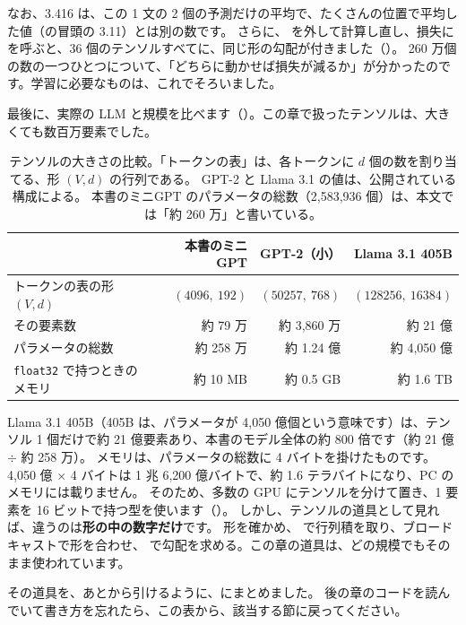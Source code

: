 なお、3.416 は、この 1 文の 2 個の予測だけの平均で、たくさんの位置で平均した値（の冒頭の 3.11）とは別の数です。
さらに、 を外して計算し直し、損失に  を呼ぶと、36 個のテンソルすべてに、同じ形の勾配が付きました（）。
260 万個の数の一つひとつについて、「どちらに動かせば損失が減るか」が分かったのです。学習に必要なものは、これでそろいました。

最後に、実際の LLM と規模を比べます（）。この章で扱ったテンソルは、大きくても数百万要素でした。

\begin{table}[tbp]
\centering
\caption{テンソルの大きさの比較。「トークンの表」は、各トークンに $d$ 個の数を割り当てる、形 $(V,d)$ の行列である。
GPT-2 と Llama 3.1 の値は、公開されている構成による\cite{radford2019language,dubey2024llama3}。
本書のミニGPT のパラメータの総数（2,583,936 個）は、本文では「約 260 万」と書いている。}
\label{tab:pt-scale}
\small
\begin{tabular}{@{}lrrr@{}}
\toprule
 & 本書のミニGPT & GPT-2（小） & Llama 3.1 405B \\
\midrule
トークンの表の形 $(V,d)$ & $(4096,\ 192)$ & $(50257,\ 768)$ & $(128256,\ 16384)$ \\
その要素数 & 約 79 万 & 約 3,860 万 & 約 21 億 \\
パラメータの総数 & 約 258 万 & 約 1.24 億 & 約 4,050 億 \\
\texttt{float32} で持つときのメモリ & 約 10 MB & 約 0.5 GB & 約 1.6 TB \\
\bottomrule
\end{tabular}
\end{table}

Llama 3.1 405B（405B は、パラメータが 4,050 億個という意味です）は、テンソル 1 個だけで約 21 億要素あり、本書のモデル全体の約 800 倍です（約 21 億 $\div$ 約 258 万）。
メモリは、パラメータの総数に 4 バイトを掛けたものです。
4,050 億 $\times$ 4 バイトは 1 兆 6,200 億バイトで、約 1.6 テラバイトになり、PC のメモリには載りません。
そのため、多数の GPU にテンソルを分けて置き、1 要素を 16 ビットで持つ型を使います（）。
しかし、テンソルの道具として見れば、違うのは\textbf{形の中の数字だけ}です。
形を確かめ、 で行列積を取り、ブロードキャストで形を合わせ、 で勾配を求める。この章の道具は、どの規模でもそのまま使われています。

その道具を、あとから引けるように、にまとめました。
後の章のコードを読んでいて書き方を忘れたら、この表から、該当する節に戻ってください。

